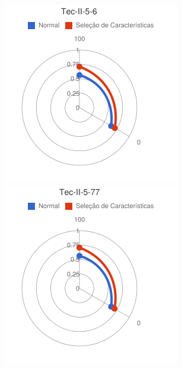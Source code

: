 \begin{figure}
\begin{minipage}{.3\textwidth}
\end{minipage}
\begin{minipage}{.3\textwidth}
  \centering
  \includegraphics[width=\linewidth]{img/red-ufes-moodle/image19.png}
\end{minipage}%
\begin{minipage}{.3\textwidth}
  \centering
  \includegraphics[width=\linewidth]{img/red-ufes-moodle/image20.png}

\end{minipage}
\end{figure}

